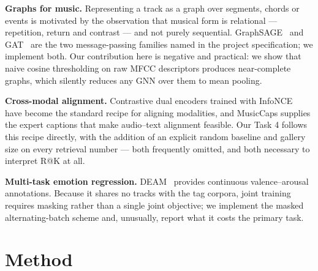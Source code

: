 \documentclass[conference]{IEEEtran}
\begin{document}
\textbf{Graphs for music.} Representing a track as a graph over segments,
chords or events is motivated by the observation that musical form is
relational --- repetition, return and contrast --- and not purely sequential.
GraphSAGE~\cite{sage} and GAT~\cite{gat} are the two message-passing families named in the project
specification; we implement both. Our contribution here is negative and
practical: we show that naive cosine thresholding on raw MFCC descriptors
produces near-complete graphs, which silently reduces any GNN over them to
mean pooling.

\textbf{Cross-modal alignment.} Contrastive dual encoders trained with InfoNCE~\cite{infonce}
have become the standard recipe for aligning modalities, and MusicCaps supplies
the expert captions that make audio--text alignment feasible. Our Task 4 follows
this recipe directly, with the addition of an explicit random baseline and
gallery size on every retrieval number --- both frequently omitted, and both
necessary to interpret R@K at all.

\textbf{Multi-task emotion regression.} DEAM~\cite{deam} provides continuous
valence--arousal annotations. Because it shares no tracks with the tag corpora,
joint training requires masking rather than a single joint objective; we
implement the masked alternating-batch scheme and, unusually, report what it
costs the primary task.

\section{Method}
\end{document}
